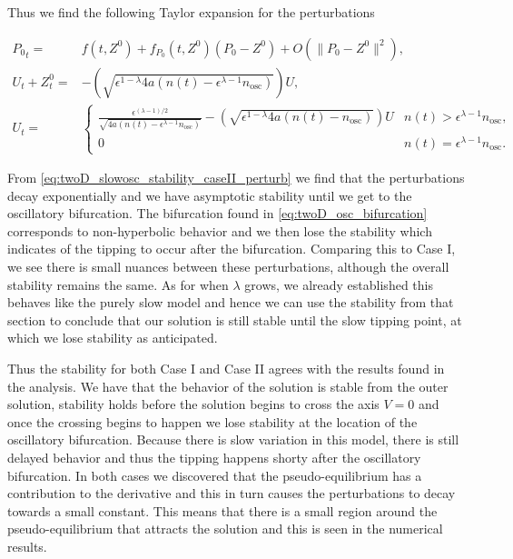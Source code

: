 Thus we find the following Taylor expansion for the perturbations

\begin{equation}\label{eq:twoD_slowosc_stability_caseII_perturb}
\begin{aligned}
{P_0}_t =& f(t,Z^0)+f_{P_0}(t,Z^0)(P_0-Z^0)+O(\lVert P_0-Z^0 \rVert^2),\\
U_t+Z^0_t=& -\left(\sqrt{\epsilon^{1-\lambda}4a(n(t)-\epsilon^{\lambda-1}n_{\text{osc}})}\right) U,\\
U_t = & \begin{cases}
\frac{\epsilon^{(\lambda-1)/2}}{\sqrt{4a(n(t)-\epsilon^{\lambda-1}n_{\text{osc}})}}-\left(\sqrt{\epsilon^{1-\lambda}4a(n(t)-n_{\text{osc}})}\right) U & n(t)>\epsilon^{\lambda-1}n_{\text{osc}},\\
0 & n(t)=\epsilon^{\lambda-1}n_{\text{osc}}.
\end{cases}
\end{aligned}
\end{equation}

From \eqref{eq:twoD_slowosc_stability_caseII_perturb} we find that the perturbations decay exponentially and we have asymptotic stability until we get to the oscillatory bifurcation. The bifurcation found in \eqref{eq:twoD_osc_bifurcation} corresponds to non-hyperbolic behavior and we then lose the stability which indicates of the tipping to occur after the bifurcation. Comparing this to Case I, we see there is small nuances between these perturbations, although the overall stability remains the same. As for when $\lambda$ grows, we already established this behaves like the purely slow model and hence we can use the stability from that section to conclude that our solution is still stable until the slow tipping point, at which we lose stability as anticipated.


Thus the stability for both Case I and Case II agrees with the results found in the analysis. We have that the behavior of the solution is stable from the outer solution, stability holds before the solution begins to cross the axis $V=0$ and once the crossing begins to happen we lose stability at the location of the oscillatory bifurcation. Because there is slow variation in this model, there is still delayed behavior and thus the tipping happens shorty after the oscillatory bifurcation. In both cases we discovered that the pseudo-equilibrium has a contribution to the derivative and this in turn causes the perturbations to decay towards a small constant. This means that there is a small region around the pseudo-equilibrium that attracts the solution and this is seen in the numerical results. 
